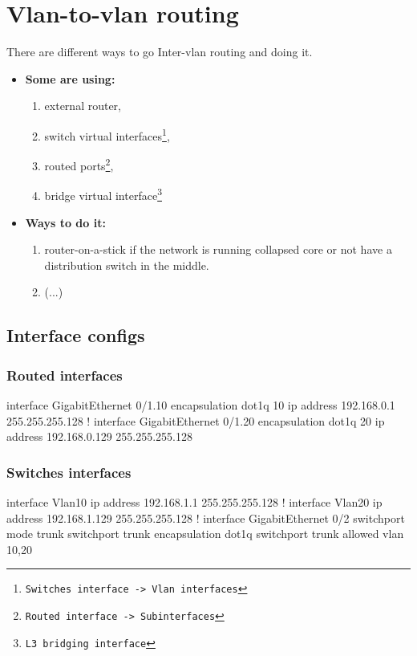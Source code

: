 \section{Vlan-to-vlan routing}


There are different ways to go  Inter-vlan routing and doing it.

\begin{itemize}
    \item \textbf{Some are using:}
    \begin{enumerate}
        \item external router,
        \item switch virtual interfaces\footnote{\texttt{Switches interface -> Vlan interfaces}},
        \item routed ports\footnote{\texttt{Routed interface -> Subinterfaces}},
        \item bridge virtual interface\footnote{\texttt{L3 bridging interface}}
    \end{enumerate}
    \item \textbf{Ways to do it:}
    \begin{enumerate}
        \item router-on-a-stick if the network is running collapsed core or not have a distribution switch in the middle.
        \item (...)
    \end{enumerate}
\end{itemize}

\pagebreak

\subsection{Interface configs}

\subsubsection{Routed interfaces}

\begin{txt}
interface GigabitEthernet 0/1.10
 encapsulation dot1q 10
 ip address 192.168.0.1 255.255.255.128
!
interface GigabitEthernet 0/1.20
 encapsulation dot1q 20
 ip address 192.168.0.129 255.255.255.128
\end{txt}

\subsubsection{Switches interfaces}

\begin{txt}
interface Vlan10
 ip address 192.168.1.1 255.255.255.128
!
interface Vlan20
 ip address 192.168.1.129 255.255.255.128
!
interface GigabitEthernet 0/2
 switchport mode trunk
 switchport trunk encapsulation dot1q
 switchport trunk allowed vlan 10,20
\end{txt}